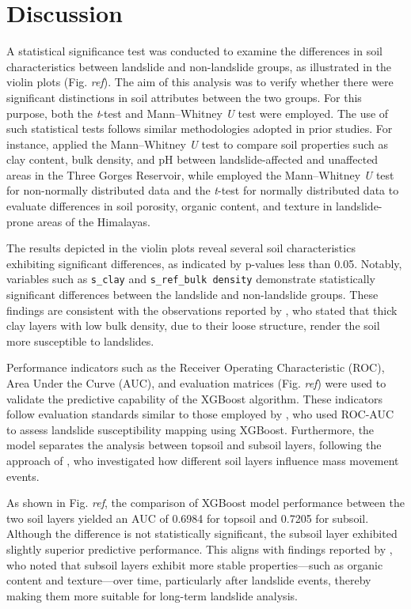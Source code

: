 \section{Discussion}

A statistical significance test was conducted to examine the differences in soil characteristics between landslide and non-landslide groups, as illustrated in the violin plots (Fig. \textit{ref}). The aim of this analysis was to verify whether there were significant distinctions in soil attributes between the two groups. For this purpose, both the \textit{t}-test and Mann–Whitney \textit{U} test were employed. The use of such statistical tests follows similar methodologies adopted in prior studies. For instance, \cite{disc01} applied the Mann–Whitney \textit{U} test to compare soil properties such as clay content, bulk density, and pH between landslide-affected and unaffected areas in the Three Gorges Reservoir, while \cite{disc02} employed the Mann–Whitney \textit{U} test for non-normally distributed data and the \textit{t}-test for normally distributed data to evaluate differences in soil porosity, organic content, and texture in landslide-prone areas of the Himalayas.

The results depicted in the violin plots reveal several soil characteristics exhibiting significant differences, as indicated by p-values less than 0.05. Notably, variables such as \texttt{s\_clay} and \texttt{s\_ref\_bulk density} demonstrate statistically significant differences between the landslide and non-landslide groups. These findings are consistent with the observations reported by \cite{disc03}, who stated that thick clay layers with low bulk density, due to their loose structure, render the soil more susceptible to landslides.

Performance indicators such as the Receiver Operating Characteristic (ROC), Area Under the Curve (AUC), and evaluation matrices (Fig. \textit{ref}) were used to validate the predictive capability of the XGBoost algorithm. These indicators follow evaluation standards similar to those employed by \cite{disc04}, who used ROC-AUC to assess landslide susceptibility mapping using XGBoost. Furthermore, the model separates the analysis between topsoil and subsoil layers, following the approach of \cite{disc05}, who investigated how different soil layers influence mass movement events.

As shown in Fig. \textit{ref}, the comparison of XGBoost model performance between the two soil layers yielded an AUC of 0.6984 for topsoil and 0.7205 for subsoil. Although the difference is not statistically significant, the subsoil layer exhibited slightly superior predictive performance. This aligns with findings reported by \cite{disc06}, who noted that subsoil layers exhibit more stable properties—such as organic content and texture—over time, particularly after landslide events, thereby making them more suitable for long-term landslide analysis.

